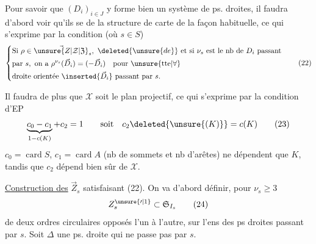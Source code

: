 Pour savoir que $(D_i)_{i\in J}$ y forme bien un
système de ps. droites, il faudra d'abord voir
qu'ils se  de la structure de carte
de la façon habituelle, ce qui s'exprime
par la condition (où $s\in S$)
\[\left\{\begin{aligned}
&\text{Si }\rho\in\vec{\unsure{Z|\mathcal Z|\mathfrak Z}}_s,\ \deleted{\unsure{de}}\ \text{et si }{\nu}_s\text{ est le nb de }D_i\text{ passant}\\
&\text{par }s,\ \text{on a }\rho^{\nu_s}(\vec D_i)=(-\vec D_i)\quad\text{pour }\unsure{\text{tte}|\forall}\\
&\text{droite orientée }\inserted{\vec D_i}\text{ passant par }s.
\end{aligned}\right.\tag*{(22)}\]

Il faudra de plus que $\mathcal X$ soit le plan projectif,
ce qui s'exprime par la condition d'EP
\[\underbrace{c_0-c_1}_{1-c(K)}+c_2=1\qquad\text{soit}\quad c_2\deleted{\unsure{(K)}}=c(K)\tag*{(23)}\]
$c_0=\operatorname{card} S$, $c_1=\operatorname{card} A$ (nb de sommets et
nb d'arêtes) ne dépendent que $K$, tandis que
$c_2$  dépend bien sûr de $\mathcal X$.

\uline{Construction des} $\vec Z_s$ satisfaisant (22). On
va d'abord définir, pour $\nu_s\geq3$
\[Z_s^{\unsure{\prime|1}}\subset\mathfrak S_{I_s}\tag*{(24)}\]
 de deux ordres circulaires opposés
l'un à l'autre, sur l'ens  des ps droites passant
par $s$. Soit $\Delta$  une ps. droite qui ne
passe pas par $s$.  

